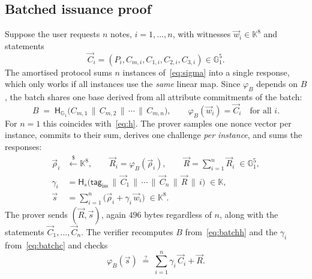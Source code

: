 \documentclass[10pt,a5paper]{article}
\newcommand{\K}[1]{#1}                      %
\newcommand{\Go}[1]{#1}                     %
\newcommand{\K}[1]{{\color{ScalarCol}#1}}   %
\newcommand{\Go}[1]{{\color{GoneCol}#1}}    %
\newcommand{\F}{\mathbb{K}}
\newcommand{\GG}[1]{\mathbb{G}_{#1}}
\newcommand{\Hs}{\mathsf{H}_{s}}
\newcommand{\Hg}{\mathsf{H}_{\GG{1}}}
\newcommand{\dtag}{\mathsf{tag}}
\newcommand{\vv}[1]{\vec{#1}}
\newcommand{\sample}{\stackrel{\$}{\leftarrow}}
\newcommand{\eqq}{\stackrel{?}{=}}
\begin{document}
\subsection{Batched issuance proof}
\label{sec:batchproof}

Suppose the user requests $n$ notes, $i = 1,\dots,n$, with witnesses
$\vv{w}_i \in \F^8$ and statements
\[
  \vv{C}_i = (\Go{P_i}, \Go{C_{m,i}}, \Go{C_{1,i}}, \Go{C_{2,i}}, \Go{C_{3,i}}) \in \GG{1}^5 .
\]
The amortised protocol sums $n$ instances of~\eqref{eq:sigma}
into a single response, which only works if all instances use the \emph{same}
linear map. Since $\varphi_{\Go{B}}$ depends on $\Go{B}$, the batch shares one
base derived from all attribute commitments of the batch:
\begin{equation}
  \Go{B} \;=\; \Hg\bigl(\Go{C_{m,1}} \,\|\, \Go{C_{m,2}} \,\|\, \cdots \,\|\, \Go{C_{m,n}}\bigr),
  \qquad
  \varphi_{\Go{B}}(\vv{w}_i) = \vv{C}_i \quad \text{for all } i .
  \label{eq:batchh}
\end{equation}
For $n = 1$ this coincides with~\eqref{eq:h}. The prover samples one nonce
vector per instance, commits to their sum, derives one challenge \emph{per
instance}, and sums the responses:
\begin{align}
  \vv{\rho}_i &\sample \F^8, \qquad \vv{R}_i = \varphi_{\Go{B}}(\vv{\rho}_i), \qquad
  \vv{R} = \sum_{i=1}^{n} \vv{R}_i \;\in \GG{1}^5, \label{eq:batchR} \\
  \K{\gamma_i} &= \Hs\bigl(\dtag_{\mathrm{iss}} \,\|\, \vv{C}_1 \,\|\, \cdots \,\|\, \vv{C}_n \,\|\, \vv{R} \,\|\, i\bigr) \;\in \F, \label{eq:batchc} \\
  \vv{s} &= \sum_{i=1}^{n} \bigl(\vv{\rho}_i + \K{\gamma_i}\,\vv{w}_i\bigr) \;\in \F^8 . \label{eq:batchs}
\end{align}
The prover sends $(\vv{R}, \vv{s})$, again $496$ bytes regardless of $n$, along
with the statements $\vv{C}_1,\dots,\vv{C}_n$. The verifier recomputes
$\Go{B}$ from~\eqref{eq:batchh} and the $\K{\gamma_i}$ from~\eqref{eq:batchc} and
checks
\begin{equation}
  \varphi_{\Go{B}}(\vv{s}) \;\eqq\; \sum_{i=1}^{n} \K{\gamma_i}\,\vv{C}_i + \vv{R}.
  \label{eq:batchverify}
\end{equation}
\end{document}
